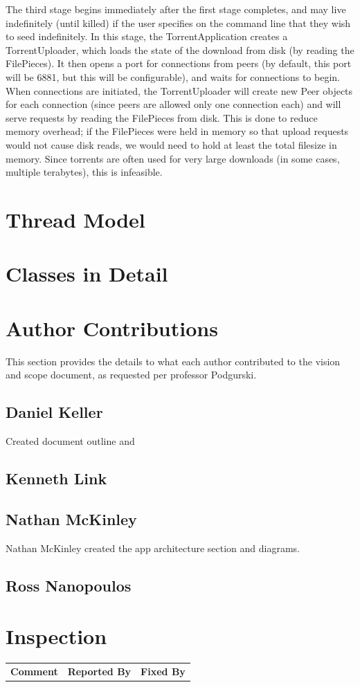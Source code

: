 \documentclass[letter]{scrartcl}
\begin{document}
The third stage begins immediately after the first stage completes, and may live indefinitely (until killed) if the user specifies on the command line that they wish to seed indefinitely.  In this stage, the TorrentApplication creates a TorrentUploader, which loads the state of the download from disk (by reading the FilePieces).  It then opens a port for connections from peers (by default, this port will be 6881, but this will be configurable), and waits for connections to begin.  When connections are initiated, the TorrentUploader will create new Peer objects for each connection (since peers are allowed only one connection each) and will serve requests by reading the FilePieces from disk.  This is done to reduce memory overhead; if the FilePieces were held in memory so that upload requests would not cause disk reads, we would need to hold at least the total filesize in memory.  Since torrents are often used for very large downloads (in some cases, multiple terabytes), this is infeasible.

\section{Thread Model}

\section{Classes in Detail}

\pagebreak
\section{Author Contributions}
This section provides the details to what each author contributed to the vision and scope document, as requested per professor Podgurski.
\subsection{Daniel Keller}
Created document outline and 
\subsection{Kenneth Link}

\subsection{Nathan McKinley}
Nathan McKinley created the app architecture section and diagrams.
\subsection{Ross Nanopoulos}


\section{Inspection}
\begin{tabularx}{\textwidth}{X c c}
\textbf{Comment} & \textbf{Reported By} & \textbf{Fixed By} \\
\end{tabularx}
\end{document}
